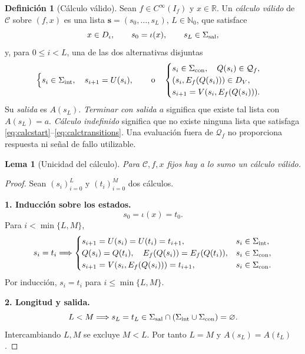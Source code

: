 \documentclass[11pt,a4paper]{article}
\numberwithin{equation}{section}
\newtheorem{lemma}[theorem]{Lema}
\theoremstyle{definition}
\newtheorem{definition}[theorem]{Definición}
\theoremstyle{remark}
\newcommand{\R}{\mathbb R}
\newcommand{\Nn}{\mathbb N_0}
\newcommand{\QQ}{\mathcal Q}
\newcommand{\paso}[1]{\par\smallskip\noindent\textbf{#1}\quad}
\begin{document}
\begin{definition}[Cálculo válido]\label{def:validcalc}
Sean $f\in C^\infty(I_f)$ y $x\in\R$. Un \emph{cálculo válido} de $\mathscr C$ sobre $(f,x)$ es una lista $\boldsymbol s=(s_0,\ldots,s_L)$, $L\in\Nn$, que satisface
\begin{equation}\label{eq:calcstart}
x\in D_\iota,\qquad s_0=\iota(x),\qquad s_L\in\Sigma_{\rm sal},
\end{equation}
y, para $0\le i<L$, una de las dos alternativas disjuntas
\begin{equation}\label{eq:calctransitions}
\begin{cases}
s_i\in\Sigma_{\rm int},\quad s_{i+1}=U(s_i),
\end{cases}
\quad\text{o}\quad
\begin{cases}
s_i\in\Sigma_{\rm con},\quad Q(s_i)\in\QQ_f,\\
(s_i,E_f(Q(s_i)))\in D_V,\\
s_{i+1}=V(s_i,E_f(Q(s_i))).
\end{cases}
\end{equation}
Su \emph{salida} es $A(s_L)$. \emph{Terminar con salida $a$} significa que existe tal lista con $A(s_L)=a$. \emph{Cálculo indefinido} significa que no existe ninguna lista que satisfaga \eqref{eq:calcstart}--\eqref{eq:calctransitions}. Una evaluación fuera de $\QQ_f$ no proporciona respuesta ni señal de fallo utilizable.
\end{definition}

\begin{lemma}[Unicidad del cálculo]\label{lem:calcunique}
Para $\mathscr C,f,x$ fijos hay a lo sumo un cálculo válido.
\end{lemma}
\begin{proof}
Sean $(s_i)_{i=0}^L$ y $(t_i)_{i=0}^M$ dos cálculos.
\paso{1. Inducción sobre los estados.}
\[
s_0=\iota(x)=t_0.
\]
Para $i<\min\{L,M\}$,
\[
s_i=t_i\Longrightarrow
\begin{cases}
s_{i+1}=U(s_i)=U(t_i)=t_{i+1},&s_i\in\Sigma_{\rm int},\\
Q(s_i)=Q(t_i),\quad E_f(Q(s_i))=E_f(Q(t_i)),&s_i\in\Sigma_{\rm con},\\
s_{i+1}=V(s_i,E_f(Q(s_i)))=t_{i+1},&s_i\in\Sigma_{\rm con}.
\end{cases}
\]
Por inducción, $s_i=t_i$ para $i\le\min\{L,M\}$.
\paso{2. Longitud y salida.}
\[
L<M\Longrightarrow s_L=t_L\in\Sigma_{\rm sal}\cap(\Sigma_{\rm int}\cup\Sigma_{\rm con})=\varnothing.
\]
Intercambiando $L,M$ se excluye $M<L$. Por tanto $L=M$ y $A(s_L)=A(t_L)$.
\end{proof}
\end{document}

